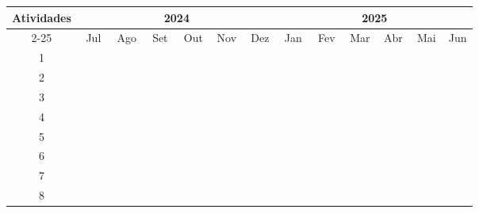 \begin{center}


{\small \noindent
\begin{tabular}{|c|c|c|c|c|c|c|c|c|c|c|c|c|c|c|c|c|c|c|c|c|c|c|c|c|}
\hline
\multicolumn{1}{|c|}{\multirow{2}{*}{Atividades}} & \multicolumn{12}{c|}{2024} & \multicolumn{12}{c|}{2025} \\ \cline{2-25}
& \multicolumn{2}{c|}{Jul} & \multicolumn{2}{c|}{Ago} & \multicolumn{2}{c|}{Set} & \multicolumn{2}{c|}{Out} & \multicolumn{2}{c|}{Nov} & \multicolumn{2}{c|}{Dez} & \multicolumn{2}{c|}{Jan} & \multicolumn{2}{c|}{Fev} & \multicolumn{2}{c|}{Mar} & \multicolumn{2}{c|}{Abr} & \multicolumn{2}{c|}{Mai} & \multicolumn{2}{c|}{Jun} \\ \hline
1 & ~ & ~ & \cellcolor{black} & ~ & ~ & ~ & ~ & ~ & ~ & ~ & ~ & ~ & ~ & ~ & ~ & ~ & ~ & ~ & ~ & ~ & ~ & ~ & ~ & \\ \hline
2 & ~ & ~ & ~ & \cellcolor{black} & ~ & ~ & ~ & ~ & ~ & ~ & ~ & ~ & ~ & ~ & ~ & ~ & ~ & ~ & ~ & ~ & ~ & ~ & ~ & \\ \hline
3 & ~ & ~ & ~ & ~ & \cellcolor{black} & ~ & ~ & ~ & ~ & ~ & ~ & ~ & ~ & ~ & ~ & ~ & ~ & ~ & ~ & ~ & ~ & ~ & ~ & \\ \hline
4 & ~ & ~ & ~ & ~ & ~ & \cellcolor{black} & \cellcolor{black} & \cellcolor{black} & \cellcolor{black} & ~ & ~ & ~ & ~ & ~ & ~ & ~ & ~ & ~ & ~ & ~ & ~ & ~ & ~ & \\ \hline
5 & ~ & ~ & ~ & ~ & ~ & ~ & ~ & ~ & ~ & \cellcolor{black} & \cellcolor{black} & ~ & ~ & ~ & ~ & ~ & ~ & ~ & ~ & ~ & ~ & ~ & ~ & \\ \hline
6 & ~ & ~ & ~ & ~ & ~ & ~ & ~ & ~ & ~ & ~ & ~ & \cellcolor{black} & \cellcolor{black} & ~ & ~ & ~ & ~ & ~ & ~ & ~ & ~ & ~ & ~ & \\ \hline
7 & ~ & ~ & ~ & ~ & ~ & ~ & ~ & ~ & ~ & ~ & ~ & ~ & ~ & \cellcolor{black} & \cellcolor{black} & \cellcolor{black} & \cellcolor{black} & \cellcolor{black} & \cellcolor{black} & \cellcolor{black} & \cellcolor{black} & \cellcolor{black} & ~ & \\ \hline
8 & ~ & ~ & \cellcolor{black} & \cellcolor{black} & \cellcolor{black} & \cellcolor{black} & \cellcolor{black} & \cellcolor{black} & \cellcolor{black} & \cellcolor{black} & \cellcolor{black} & \cellcolor{black} & \cellcolor{black} & \cellcolor{black} & \cellcolor{black} & \cellcolor{black} & \cellcolor{black} & \cellcolor{black} & \cellcolor{black} & \cellcolor{black} & \cellcolor{black} & \cellcolor{black} & ~ & \\ \hline
\end{tabular}
}

\end{center}